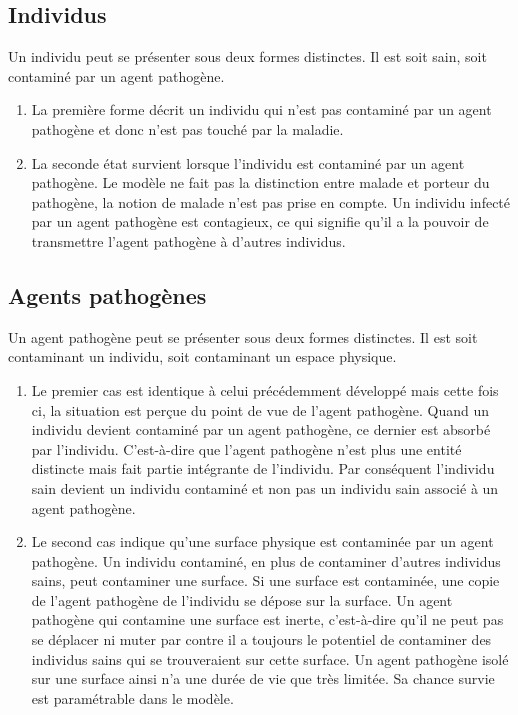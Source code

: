 \subsection{Individus}

Un individu peut se présenter sous deux formes distinctes. Il est soit sain, soit contaminé par un agent pathogène.\\

\begin{enumerate}
	\item La première forme décrit un individu qui n'est pas contaminé par un agent pathogène et donc n'est pas touché par la maladie.
	\item La seconde état survient lorsque l'individu est contaminé par un agent pathogène. Le modèle ne fait pas la distinction entre malade et porteur du pathogène, la notion de malade n'est pas prise en compte. Un individu infecté par un agent pathogène est contagieux, ce qui signifie qu'il a la pouvoir de transmettre l'agent pathogène à d'autres individus.
\end{enumerate}

\subsection{Agents pathogènes}

Un agent pathogène peut se présenter sous deux formes distinctes. Il est soit contaminant un individu, soit contaminant un espace physique.

\begin{enumerate}
\item Le premier cas est identique à celui précédemment développé mais cette fois ci, la situation est perçue du point de vue de l'agent pathogène. Quand un individu devient contaminé par un agent pathogène, ce dernier est absorbé par l'individu. C'est-à-dire que l'agent pathogène n'est plus une entité distincte mais fait partie intégrante de l'individu. Par conséquent l'individu sain devient un individu contaminé et non pas un individu sain associé à un agent pathogène.
\item Le second cas indique qu'une surface physique est contaminée par un agent pathogène. Un individu contaminé, en plus de contaminer d'autres individus sains, peut contaminer une surface. Si une surface est contaminée, une copie de l'agent pathogène de l'individu se dépose sur la surface. Un agent pathogène qui contamine une surface est inerte, c'est-à-dire qu'il ne peut pas se déplacer ni muter par contre il a toujours le potentiel de contaminer des individus sains qui se trouveraient sur cette surface. Un agent pathogène isolé sur une surface ainsi n'a une durée de vie que très limitée. Sa chance survie est paramétrable dans le modèle.
\end{enumerate}

